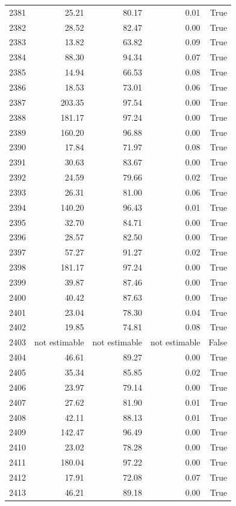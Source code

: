 \begin{longtable}{rrrrr}
2381 & 25.21 & 80.17 & 0.01 & True \\
2382 & 28.52 & 82.47 & 0.00 & True \\
2383 & 13.82 & 63.82 & 0.09 & True \\
2384 & 88.30 & 94.34 & 0.07 & True \\
2385 & 14.94 & 66.53 & 0.08 & True \\
2386 & 18.53 & 73.01 & 0.06 & True \\
2387 & 203.35 & 97.54 & 0.00 & True \\
2388 & 181.17 & 97.24 & 0.00 & True \\
2389 & 160.20 & 96.88 & 0.00 & True \\
2390 & 17.84 & 71.97 & 0.08 & True \\
2391 & 30.63 & 83.67 & 0.00 & True \\
2392 & 24.59 & 79.66 & 0.02 & True \\
2393 & 26.31 & 81.00 & 0.06 & True \\
2394 & 140.20 & 96.43 & 0.01 & True \\
2395 & 32.70 & 84.71 & 0.00 & True \\
2396 & 28.57 & 82.50 & 0.00 & True \\
2397 & 57.27 & 91.27 & 0.02 & True \\
2398 & 181.17 & 97.24 & 0.00 & True \\
2399 & 39.87 & 87.46 & 0.00 & True \\
2400 & 40.42 & 87.63 & 0.00 & True \\
2401 & 23.04 & 78.30 & 0.04 & True \\
2402 & 19.85 & 74.81 & 0.08 & True \\
2403 & not estimable & not estimable & not estimable & False \\
2404 & 46.61 & 89.27 & 0.00 & True \\
2405 & 35.34 & 85.85 & 0.02 & True \\
2406 & 23.97 & 79.14 & 0.00 & True \\
2407 & 27.62 & 81.90 & 0.01 & True \\
2408 & 42.11 & 88.13 & 0.01 & True \\
2409 & 142.47 & 96.49 & 0.00 & True \\
2410 & 23.02 & 78.28 & 0.00 & True \\
2411 & 180.04 & 97.22 & 0.00 & True \\
2412 & 17.91 & 72.08 & 0.07 & True \\
2413 & 46.21 & 89.18 & 0.00 & True \\

\end{longtable}
